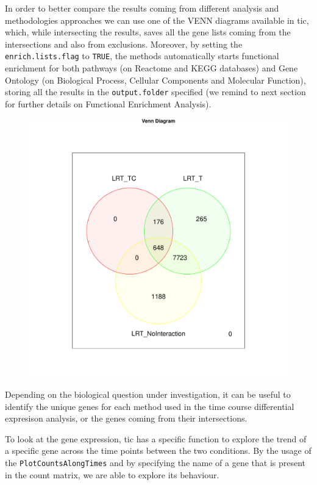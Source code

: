 In order to better compare the results coming from different analysis and methodologies approaches we can use one of the VENN diagrams available in \gls{tic}, which, while intersecting the results, saves all the gene lists coming from the intersections and also from exclusions.
Moreover, by setting the \lstinline!enrich.lists.flag! to \lstinline!TRUE!, the methods automatically starts functional enrichment for both pathways (on Reactome and KEGG databases) and Gene Ontology (on Biological Process, Cellular Components and Molecular Function), storing all the results in the \lstinline!output.folder! specified (we remind to next section for further details on Functional Enrichment Analysis).

\begin{figure}[H]
\includegraphics[width=\textwidth,height=\textheight,keepaspectratio]{img/ticorser/de/venn3.pdf}
\caption[ticorser venn diagram]{}
\label{fig:ticorservenn}
\centering
\end{figure}

Depending on the biological question under investigation, it can be useful to identify the unique genes for each method used in the time course differential expresison analysis, or the genes coming from their intersections.

To look at the gene expression, \gls{tic} has a specific function to explore the trend of a specific gene across the time points between the two conditions. 
By the usage of the \lstinline!PlotCountsAlongTimes! and by specifying the name of a gene that is present in the count matrix, we are able to explore its behaviour.

